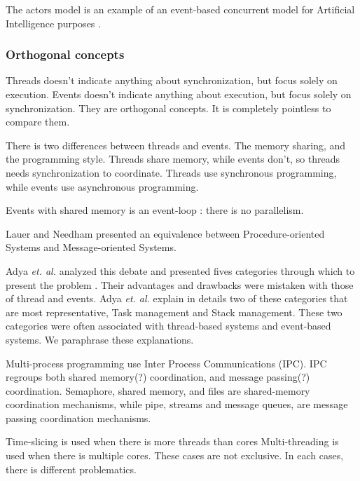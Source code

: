 
The actors model is an example of an event-based concurrent model for Artificial Intelligence purposes \cite{Hewitt1973a}.

\subsubsection{Orthogonal concepts}

Threads doesn't indicate anything about synchronization, but focus solely on execution.
Events doesn't indicate anything about execution, but focus solely on synchronization.
They are orthogonal concepts.
It is completely pointless to compare them.

There is two differences between threads and events.
The memory sharing, and the programming style.
Threads share memory, while events don't, so threads needs synchronization to coordinate.
Threads use synchronous programming, while events use asynchronous programming.

Events with shared memory is an event-loop : there is no parallelism.





Lauer and Needham \cite{Lauer1979} presented an equivalence between Procedure-oriented Systems and Message-oriented Systems.




Adya \textit{et. al.} analyzed this debate and presented fives categories through which to present the problem \cite{Adya2002}.
Their advantages and drawbacks were mistaken with those of thread and events.
Adya \textit{et. al.} explain in details two of these categories that are most representative, Task management and Stack management.
These two categories were often associated with thread-based systems and event-based systems.
We paraphrase these explanations.

Multi-process programming use Inter Process Communications (IPC).
IPC regroups both shared memory(?) coordination, and message passing(?) coordination.
Semaphore, shared memory, and files are shared-memory coordination mechanisms, while pipe, streams and message queues, are message passing coordination mechanisms.

Time-slicing is used when there is more threads than cores
Multi-threading is used when there is multiple cores.
These cases are not exclusive.
In each cases, there is different problematics.


